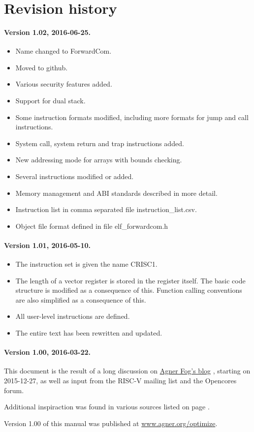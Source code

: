\documentclass[forwardcom.tex]{subfiles}
\begin{document}
\RaggedRight

\chapter{Revision history}

\subsubsection{Version 1.02, 2016-06-25.}
\begin{itemize}
\item Name changed to ForwardCom.
\item Moved to github.
\item Various security features added.
\item Support for dual stack.
\item Some instruction formats modified, including more formats for jump and call instructions.
\item System call, system return and trap instructions added.
\item New addressing mode for arrays with bounds checking.
\item Several instructions modified or added.
\item Memory management and ABI standards described in more detail.
\item Instruction list in comma separated file instruction\_list.csv.
\item Object file format defined in file elf\_forwardcom.h
\end{itemize}

\subsubsection{Version 1.01, 2016-05-10.}
\begin{itemize}
\item The instruction set is given the name CRISC1.
\item The length of a vector register is stored in the register itself. The basic code structure is modified as a consequence of this. Function calling conventions are also simplified as a consequence of this.
\item All user-level instructions are defined.
\item The entire text has been rewritten and updated.
\end{itemize}

\subsubsection{Version 1.00, 2016-03-22.}
This document is the result of a long discussion on 
\href{http://www.agner.org/optimize/blog/read.php?i=421}{Agner Fog's blog}
, starting on 2015-12-27, as well as input from the RISC-V mailing list and the Opencores forum.
\vspace{2mm}

Additional inspiraction was found in various sources listed on page \pageref{referencesToIntroduction}. 
\vspace{2mm}

Version 1.00 of this manual was published at 
\href{http://www.agner.org/optimize}{www.agner.org/optimize}.
\end{document}
